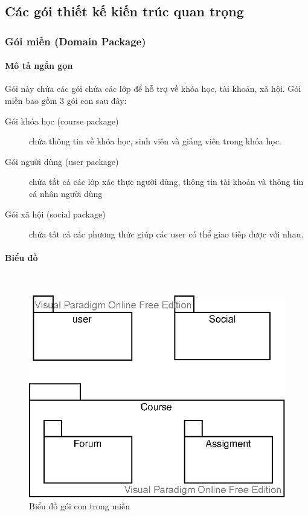 \documentclass[./../main_file.tex]{subfiles}
\begin{document}
	\subsection{Các gói thiết kế kiến trúc quan trọng}
	\subsubsection{Gói miền (Domain Package)}
	\paragraph{Mô tả ngắn gọn}
	Gói này chứa các gói chứa các lớp để hỗ trợ về khóa học, tài khoản, xã hội. Gói miền bao gồm 3 gói con sau đây:
	\begin{description}
		\item[Gói khóa học (course package)] chứa thông tin về khóa học, sinh viên và giảng viên trong khóa học.
		\item[Gói người dùng (user package)] chứa tất cả các lớp xác thực người dùng, thông tin tài khoản và thông tin cá nhân người dùng
		\item[Gói xã hội (social package)] chứa tất cả các phương thức giúp các user có thể giao tiếp được với nhau.
	\end{description}
	\paragraph{Biểu đồ} ~\\
	\begin{figure}[htb]
		\centering
				\includegraphics[width=\linewidth]{./images/subpackageindomaindigram.eps}
		\caption{Biểu đồ gói con trong miền}
	\end{figure}
\end{document}
